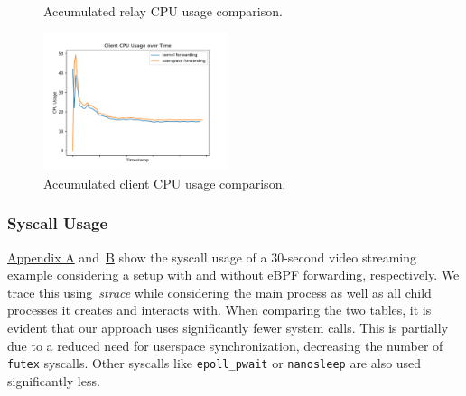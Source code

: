 \begin{figure}[H]
\begin{minipage}{0.48\textwidth}
        \caption[Relay CPU usage comparison]{Accumulated relay CPU usage comparison.}\label{fig:cpu-utilization-relay}
    \end{minipage}\hfill
    \begin{minipage}{\textwidth}
        \centering
        \includegraphics[width=0.48\textwidth]{figures/04_testing_and_results/cpu_usage_client_ns.pdf}
        \caption[Client CPU usage comparison]{Accumulated client CPU usage comparison.}\label{fig:cpu-utilization-client}
    \end{minipage}
\end{figure}



\subsubsection{Syscall Usage}
\hyperref[chap:appendix-fast-relay]{Appendix A} and~\hyperref[chap:appendix-plain-relay]{B} show 
the syscall usage of a 30-second video streaming example considering a setup with and without eBPF 
forwarding, respectively.
We trace this using~\textit{strace} while considering the main process as well as all child processes
it creates and interacts with.
When comparing the two tables, it is evident that our approach uses significantly fewer system calls.
This is partially due to a reduced need for userspace synchronization, decreasing the number of \verb|futex| syscalls.
Other syscalls like \verb|epoll_pwait| or \verb|nanosleep| are also used significantly less.

